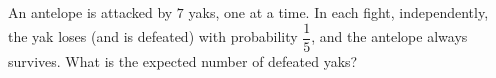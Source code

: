 An antelope is attacked by $7$ yaks, one at a time. In each fight, independently, the yak loses (and is defeated) with probability $\dfrac{1}{5}$, and the antelope always survives. What is the expected number of defeated yaks?
